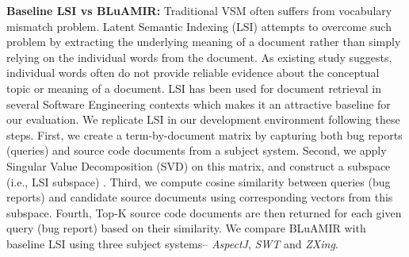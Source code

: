 \documentclass[sigconf,review,anonymous]{acmart}
\begin{document}
\textbf{Baseline LSI vs BLuAMIR:} Traditional VSM often suffers from vocabulary mismatch problem. Latent Semantic Indexing (LSI)
attempts to overcome such problem by extracting the underlying meaning of a document rather than simply relying on the individual words from the document. As existing study \cite{LSIindexing} suggests, individual words often do not provide reliable evidence about the conceptual topic or meaning of a document. LSI has been used for document retrieval in several Software Engineering contexts \cite{MarcusLSI,MarcusMaletic} which makes it an attractive baseline for our evaluation. We replicate LSI in our development environment following these steps. First,    
we create a term-by-document matrix by capturing both bug reports (queries) and source code documents from a subject system. Second, 
we apply Singular Value Decomposition (SVD) on this matrix, and construct a subspace (i.e., LSI subspace) \cite{SaltonMIR}. 
Third, we compute cosine similarity between queries (bug reports) and candidate source documents using corresponding vectors from  this subspace. Fourth, Top-K source code documents are then returned for each given query (bug report) based on their similarity.  
We compare BLuAMIR with baseline LSI using three subject systems-- \emph{AspectJ}, \emph{SWT} and \emph{ZXing}.
\end{document}
